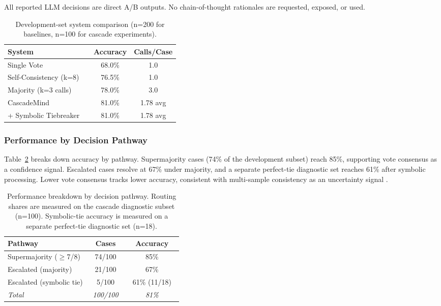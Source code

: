 \documentclass[11pt]{article}
\begin{document}
All reported LLM decisions are direct A/B outputs. No chain-of-thought rationales are requested, exposed, or used.

\begin{table}[t]
\centering
\footnotesize
\begin{tabular}{@{}p{0.50\linewidth}cc@{}}
\toprule
\textbf{System} & \textbf{Accuracy} & \textbf{Calls/Case} \\
\midrule
Single Vote & 68.0\% & 1.0 \\
Self-Consistency (k=8) & 76.5\% & 1.0 \\
Majority (k=3 calls) & 78.0\% & 3.0 \\
\midrule
CascadeMind & 81.0\% & 1.78 avg \\
\quad + Symbolic Tiebreaker & 81.0\% & 1.78 avg \\
\bottomrule
\end{tabular}
\caption{Development-set system comparison (n=200 for baselines, n=100 for cascade experiments).}
\label{tab:dev_results}
\end{table}



\subsubsection{Performance by Decision Pathway}
Table~\ref{tab:ablation} breaks down accuracy by pathway. Supermajority cases (74\% of the development subset) reach 85\%, supporting vote consensus as a confidence signal. Escalated cases resolve at 67\% under majority, and a separate perfect-tie diagnostic set reaches 61\% after symbolic processing. Lower vote consensus tracks lower accuracy, consistent with multi-sample consistency as an uncertainty signal \citep{xiong2024uncertainty}.

\begin{table}[t]
\centering
\footnotesize
\begin{tabular}{@{}p{0.47\linewidth}cc@{}}
\toprule
\textbf{Pathway} & \textbf{Cases} & \textbf{Accuracy} \\
\midrule
Supermajority ($\geq$7/8) & 74/100 & 85\% \\
Escalated (majority) & 21/100 & 67\% \\
Escalated (symbolic tie) & 5/100 & 61\% (11/18) \\
\midrule
\textit{Total} & \textit{100/100} & \textit{81\%} \\
\bottomrule
\end{tabular}
\caption{Performance breakdown by decision pathway. Routing shares are measured on the cascade diagnostic subset (n=100). Symbolic-tie accuracy is measured on a separate perfect-tie diagnostic set (n=18).}
\label{tab:ablation}
\end{table}
\end{document}
